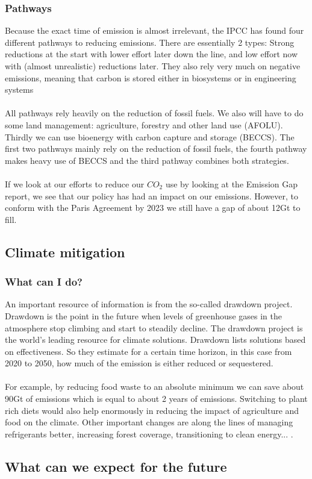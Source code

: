 \documentclass[../summary.tex]{subfiles}
\begin{document}
			\subsubsection{Pathways}
				Because the exact time of emission is almost irrelevant, the IPCC has found four different pathways to reducing emissions. There are essentially 2 types: Strong reductions at the start with lower effort later down the line, and low effort now with (almost unrealistic) reductions later. They also rely very much on negative emissions, meaning that carbon is stored either in biosystems or in engineering systems\\
				\\
				All pathways rely heavily on the reduction of fossil fuels. We also will have to do some land management: agriculture, forestry and other land use (AFOLU). Thirdly we can use bioenergy with carbon capture and storage (BECCS). The first two pathways mainly rely on the reduction of fossil fuels, the fourth pathway makes heavy use of BECCS and the third pathway combines both strategies. \\
				\\
				If we look at our efforts to reduce our $CO_2$ use by looking at the Emission Gap report, we see that our policy has had an impact on our emissions. However, to conform with the Paris Agreement by 2023 we still have a gap of about 12Gt to fill. %
		
		\subsection{Climate mitigation}
			\subsubsection{What can I do?}
				An important resource of information is from the so-called drawdown project. Drawdown is the point in the future when levels of greenhouse gases in the atmosphere stop climbing and start to steadily decline. The drawdown project is the world's leading resource for climate solutions. Drawdown lists solutions based on effectiveness. So they estimate for a certain time horizon, in this case from 2020 to 2050, how much of the emission is either reduced or sequestered. \\
				\\
				For example, by reducing food waste to an absolute minimum we can save about 90Gt of emissions which is equal to about 2 years of emissions. Switching to plant rich diets would also help enormously in reducing the impact of agriculture and food on the climate. Other important changes are along the lines of managing refrigerants better, increasing forest coverage, transitioning to clean energy... .
				
			 
		\subsection{What can we expect for the future}
	
\end{document}
